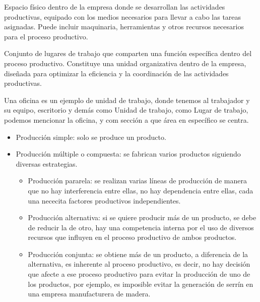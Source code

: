 \documentclass[12pt]{report} %
\providecommand{\tightlist}{%
  \setlength{\itemsep}{0pt}\setlength{\parskip}{0pt}}
\begin{document}
\begin{definicion}
Espacio físico dentro de la empresa donde se desarrollan las actividades productivas, equipado con los medios necesarios para llevar a cabo las tareas asignadas. Puede incluir maquinaria, herramientas y otros recursos necesarios para el proceso productivo.
\end{definicion}

\begin{definicion}
Conjunto de lugares de trabajo que comparten una función específica dentro del proceso productivo. Constituye una unidad organizativa dentro de la empresa, diseñada para optimizar la eficiencia y la coordinación de las actividades productivas.
\end{definicion}

\begin{ejemplo}
Una oficina es un ejemplo de unidad de trabajo, donde tenemos al trabajador y su equipo, escritorio y demás como Unidad de trabajo, como Lugar de trabajo, podemos mencionar la oficina, y com sección a que área en específico se centra.
\end{ejemplo}

\begin{itemize}
\tightlist
\item
  Producción simple: solo se produce un producto.
\item
  Producción múltiple o compuesta: se fabrican varios productos
  siguiendo diversas estrategias.

  \begin{itemize}
  \tightlist
  \item
    Producción pararela: se realizan varias líneas de producción de
    manera que no hay interferencia entre ellas, no hay dependencia
    entre ellas, cada una nececita factores productivos independientes.
  \item
    Producción alternativa: si se quiere producir más de un producto, se
    debe de reducir la de otro, hay una competencia interna por el uso
    de diversos recursos que influyen en el proceso productivo de ambos
    productos.
  \item
    Producción conjunta: se obtiene más de un producto, a diferencia de
    la alternativa, es inherente al proceso productivo, es decir, no hay
    decisión que afecte a ese proceso productivo para evitar la
    producción de uno de los productos, por ejemplo, es imposible evitar
    la generación de serrín en una empresa manufacturera de madera.
  \end{itemize}
\end{itemize}
\end{document}
